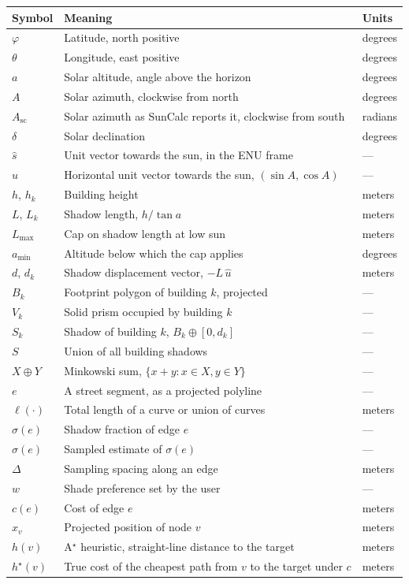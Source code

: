 \documentclass[11pt,a4paper]{article}
\theoremstyle{plain}
\theoremstyle{definition}
\theoremstyle{remark}
\begin{document}
\begin{center}
\begin{tabular}{lll}
\toprule
Symbol & Meaning & Units \\
\midrule
$\varphi$ & Latitude, north positive & degrees \\
$\theta$ & Longitude, east positive & degrees \\
$a$ & Solar altitude, angle above the horizon & degrees \\
$A$ & Solar azimuth, clockwise from north & degrees \\
$A_{\mathrm{sc}}$ & Solar azimuth as SunCalc reports it, clockwise from south & radians \\
$\delta$ & Solar declination & degrees \\
$\hat{s}$ & Unit vector towards the sun, in the ENU frame & --- \\
$\hat{u}$ & Horizontal unit vector towards the sun, $(\sin A, \cos A)$ & --- \\
$h$, $h_k$ & Building height & meters \\
$L$, $L_k$ & Shadow length, $h/\tan a$ & meters \\
$L_{\max}$ & Cap on shadow length at low sun & meters \\
$a_{\min}$ & Altitude below which the cap applies & degrees \\
$d$, $d_k$ & Shadow displacement vector, $-L\,\hat{u}$ & meters \\
$B_k$ & Footprint polygon of building $k$, projected & --- \\
$V_k$ & Solid prism occupied by building $k$ & --- \\
$S_k$ & Shadow of building $k$, $B_k \oplus [0, d_k]$ & --- \\
$S$ & Union of all building shadows & --- \\
$X \oplus Y$ & Minkowski sum, $\{x + y : x \in X, y \in Y\}$ & --- \\
$e$ & A street segment, as a projected polyline & --- \\
$\ell(\cdot)$ & Total length of a curve or union of curves & meters \\
$\sigma(e)$ & Shadow fraction of edge $e$ & --- \\
$\hat{\sigma}(e)$ & Sampled estimate of $\sigma(e)$ & --- \\
$\Delta$ & Sampling spacing along an edge & meters \\
$w$ & Shade preference set by the user & --- \\
$c(e)$ & Cost of edge $e$ & meters \\
$x_v$ & Projected position of node $v$ & meters \\
$h(v)$ & A$^\star$ heuristic, straight-line distance to the target & meters \\
$h^\star(v)$ & True cost of the cheapest path from $v$ to the target under $c$ & meters \\
\bottomrule
\end{tabular}
\end{center}
\end{document}

